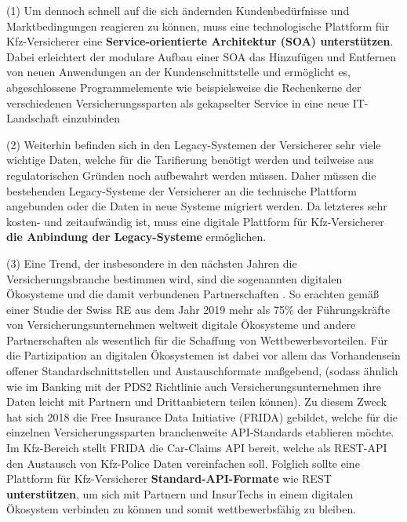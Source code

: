 
(1) Um dennoch schnell auf die sich ändernden Kundenbedürfnisse und Marktbedingungen reagieren zu können, muss eine technologische Plattform für Kfz-Versicherer eine \textbf{Service-orientierte Architektur (SOA) unterstützen}. Dabei erleichtert der modulare Aufbau einer SOA das Hinzufügen und Entfernen von neuen Anwendungen an der Kundenschnittstelle \autocite[Vgl.][S. 392]{WARG2016} und ermöglicht es, abgeschlossene Programmelemente wie beispielsweise die Rechenkerne der verschiedenen Versicherungssparten als gekapselter Service in eine neue IT-Landschaft einzubinden \autocite[Vgl.][S. 10f]{URLA2019}

(2) Weiterhin befinden sich in den Legacy-Systemen der Versicherer sehr viele wichtige Daten, welche für die Tarifierung benötigt werden und teilweise aus regulatorischen Gründen noch aufbewahrt werden müssen. Daher müssen die bestehenden Legacy-Systeme der Versicherer an die technische Plattform angebunden oder die Daten in neue Systeme migriert werden. Da letzteres sehr kosten- und zeitaufwändig ist, muss eine digitale Plattform für Kfz-Versicherer \textbf{die Anbindung der Legacy-Systeme} ermöglichen. \autocite[Vgl.][S. 10-12]{GUNTER2020}

(3) Eine Trend, der insbesondere in den nächsten Jahren die Versicherungsbranche bestimmen wird, sind die sogenannten digitalen Ökosysteme und die damit verbundenen Partnerschaften \autocite[Vgl.][]{AVRAMAKIS2023}.  So erachten gemäß einer Studie der Swiss RE aus dem Jahr 2019 mehr als 75\% der Führungskräfte von Versicherungsunternehmen weltweit digitale Ökosysteme und andere Partnerschaften als wesentlich für die Schaffung von Wettbewerbsvorteilen. \autocite[Vgl.][]{PAYNE2022} Für die Partizipation an digitalen Ökosystemen ist dabei vor allem das Vorhandensein offener Standardschnittstellen und Austauschformate maßgebend, (sodass ähnlich wie im Banking mit der PDS2 Richtlinie auch Versicherungsunternehmen ihre Daten leicht mit Partnern und Drittanbietern teilen können). Zu diesem Zweck hat sich 2018 \autocite[Vgl.][]{2021z} die Free Insurance Data Initiative (FRIDA) gebildet, welche für die einzelnen Versicherungssparten branchenweite API-Standards etablieren möchte. Im Kfz-Bereich stellt FRIDA die Car-Claims API bereit, welche als REST-API den Austausch von Kfz-Police Daten vereinfachen soll. Folglich sollte eine Plattform für Kfz-Versicherer \textbf{Standard-API-Formate} wie REST \textbf{unterstützen}, um sich mit Partnern und InsurTechs in einem digitalen Ökosystem verbinden zu können und somit wettbewerbsfähig zu bleiben. \autocite[Vgl.][]{KRETZ2023}

